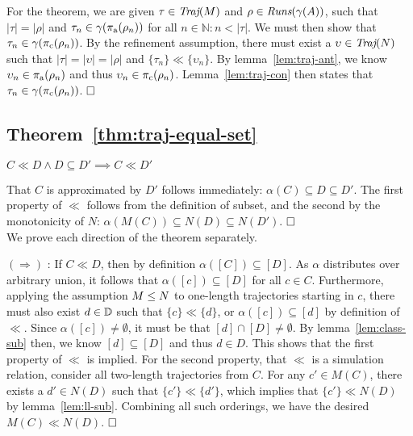 
For the theorem, we are given $\tau \in \operatorname{\textit{Traj}}(M)$ and $\rho \in \operatorname{\textit{Runs}}(\gamma(A))$, such that $| \tau | = | \rho |$ and $\tau_{n} \in \gamma(\operatorname{\pi_{\textrm{a}}}(\rho_{n}))$ for all $n \in \mathbb{N} : n < | \tau |$. We must then show that $\tau_{n} \in \gamma(\operatorname{\pi_{\textrm{c}}}(\rho_{n}))$. By the refinement assumption, there must exist a $\upsilon \in \operatorname{\textit{Traj}}(N)$ such that $| \tau | = | \upsilon | = | \rho |$ and $\{ \tau_{n} \} \ll \{ \upsilon_{n} \}$. By lemma~\ref{lem:traj-ant}, we know $\upsilon_{n} \in \operatorname{\pi_{\textrm{a}}}(\rho_{n})$ and thus $\upsilon_{n} \in \operatorname{\pi_{\textrm{c}}}(\rho_{n})$. Lemma~\ref{lem:traj-con} then states that $\tau_{n} \in \gamma(\operatorname{\pi_{\textrm{c}}}(\rho_{n}))$. $\qedbox$

\subsection{Theorem~\ref{thm:traj-equal-set}}



\begin{lemma} \label{lem:ll-sub}
$C \ll D \wedge D \subseteq D' \implies C \ll D'$
\end{lemma}

That $C$ is approximated by $D'$ follows immediately: $\alpha(C) \subseteq D \subseteq D'$. The first property of $\ll$ follows from the definition of subset, and the second by the monotonicity of $N$: $\alpha(M(C)) \subseteq N(D) \subseteq N(D')$. $\qedbox$
\\

We prove each direction of the theorem separately.

$(\Rightarrow)$ : If $C \ll D$, then by definition $\alpha([C]) \subseteq [D]$. As $\alpha$ distributes over arbitrary union, it follows that $\alpha([c]) \subseteq [D]$ for all $c \in C$. Furthermore, applying the assumption $M \leq N$ to one-length trajectories starting in $c$, there must also exist $d \in \mathbb{D}$ such that $\{ c \} \ll \{ d \}$, or $\alpha([c]) \subseteq [d]$ by definition of $\ll$. Since $\alpha([c]) \neq \emptyset$, it must be that $[d] \cap [D] \neq \emptyset$. By lemma~\ref{lem:class-sub} then, we know $[d] \subseteq [D]$ and thus $d \in D$. This shows that the first property of $\ll$ is implied. For the second property, that $\ll$ is a simulation relation, consider all two-length trajectories from $C$. For any $c' \in M(C)$, there exists a $d' \in N(D)$ such that $\{ c' \} \ll \{ d' \}$, which implies that $\{ c' \} \ll N(D)$ by lemma~\ref{lem:ll-sub}. Combining all such orderings, we have the desired $M(C) \ll N(D)$. $\qedbox$

